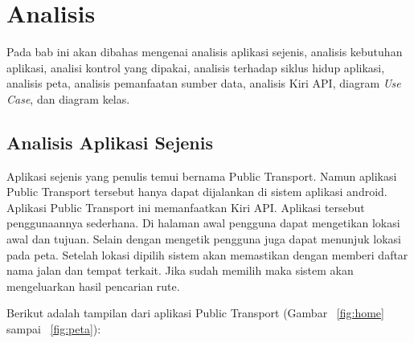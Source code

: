 \chapter{Analisis}
\label{chap:analisi}

Pada bab ini akan dibahas mengenai analisis aplikasi sejenis, analisis kebutuhan aplikasi, analisi kontrol yang dipakai, analisis terhadap siklus hidup aplikasi, analisis peta, analisis pemanfaatan sumber data, analisis Kiri API, diagram \textit{Use Case}, dan diagram kelas.

\section{Analisis Aplikasi Sejenis}
\label{lab:Analisis Aplikasi Sejenis}
\hspace{0.5cm} Aplikasi sejenis yang penulis temui bernama Public Transport\footnotemark[1]. Namun aplikasi Public Transport tersebut hanya dapat dijalankan di sistem aplikasi android. Aplikasi Public Transport ini memanfaatkan Kiri API. Aplikasi tersebut penggunaannya sederhana. Di halaman awal pengguna dapat mengetikan lokasi awal dan tujuan. Selain dengan mengetik pengguna juga dapat menunjuk lokasi pada peta. Setelah lokasi dipilih sistem akan memastikan dengan memberi daftar nama jalan dan tempat terkait. Jika sudah memilih maka sistem akan mengeluarkan hasil pencarian rute.

Berikut adalah tampilan dari aplikasi Public Transport (Gambar ~\ref{fig:home} sampai ~\ref{fig:peta}):

